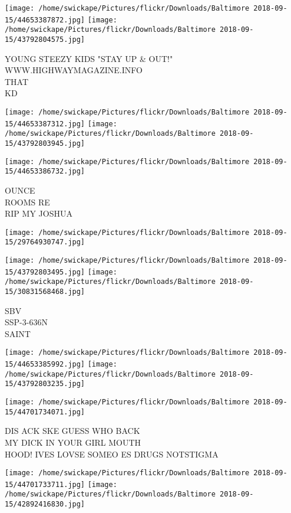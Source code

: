 \documentclass[10pt,letterpaper]{article}
\begin{document}
\texttt{[image: /home/swickape/Pictures/flickr/Downloads/Baltimore 2018-09-15/44653387872.jpg]}
\texttt{[image: /home/swickape/Pictures/flickr/Downloads/Baltimore 2018-09-15/43792804575.jpg]}

YOUNG STEEZY KIDS "STAY UP \& OUT!"\\
WWW.HIGHWAYMAGAZINE.INFO\\
THAT\\
KD
\pagebreak

\texttt{[image: /home/swickape/Pictures/flickr/Downloads/Baltimore 2018-09-15/44653387312.jpg]}
\texttt{[image: /home/swickape/Pictures/flickr/Downloads/Baltimore 2018-09-15/43792803945.jpg]}

\texttt{[image: /home/swickape/Pictures/flickr/Downloads/Baltimore 2018-09-15/44653386732.jpg]}

OUNCE\\
ROOMS RE\\
RIP MY JOSHUA
\pagebreak

\texttt{[image: /home/swickape/Pictures/flickr/Downloads/Baltimore 2018-09-15/29764930747.jpg]}

\vspace{0.25in}
\texttt{[image: /home/swickape/Pictures/flickr/Downloads/Baltimore 2018-09-15/43792803495.jpg]}
\texttt{[image: /home/swickape/Pictures/flickr/Downloads/Baltimore 2018-09-15/30831568468.jpg]}

SBV\\
SSP{-}3{-}636N\\
SAINT
\pagebreak

\texttt{[image: /home/swickape/Pictures/flickr/Downloads/Baltimore 2018-09-15/44653385992.jpg]}
\texttt{[image: /home/swickape/Pictures/flickr/Downloads/Baltimore 2018-09-15/43792803235.jpg]}

\vspace{0.25in}
\texttt{[image: /home/swickape/Pictures/flickr/Downloads/Baltimore 2018-09-15/44701734071.jpg]}

DIS ACK SKE GUESS WHO BACK\\
MY DICK IN YOUR GIRL MOUTH\\
HOOD!  IVES LOVSE SOMEO ES DRUGS NOTSTIGMA
\pagebreak

\texttt{[image: /home/swickape/Pictures/flickr/Downloads/Baltimore 2018-09-15/44701733711.jpg]}
\texttt{[image: /home/swickape/Pictures/flickr/Downloads/Baltimore 2018-09-15/42892416830.jpg]}
\end{document}
